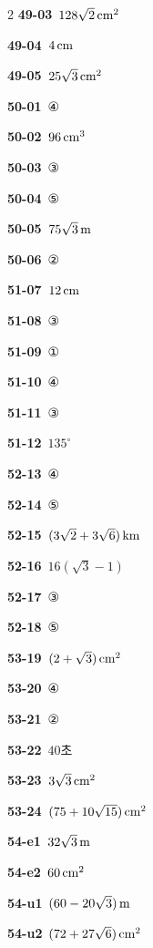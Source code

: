 \documentclass[10pt,a4paper]{article}
\begin{document}
\begin{multicols}{2}
\noindent\textbf{49-03}\ $128\sqrt{2}\mkern3mu \mathrm{cm}^2$\par
\noindent\textbf{49-04}\ $4\mkern3mu \mathrm{cm}$\par
\noindent\textbf{49-05}\ $25\sqrt{3}\mkern3mu \mathrm{cm}^2$\par
\noindent\textbf{50-01}\ ④\par
\noindent\textbf{50-02}\ $96\mkern3mu \mathrm{cm}^3$\par
\noindent\textbf{50-03}\ ③\par
\noindent\textbf{50-04}\ ⑤\par
\noindent\textbf{50-05}\ $75\sqrt{3}\mkern3mu \mathrm{m}$\par
\noindent\textbf{50-06}\ ②\par
\noindent\textbf{51-07}\ $12\mkern3mu \mathrm{cm}$\par
\noindent\textbf{51-08}\ ③\par
\noindent\textbf{51-09}\ ①\par
\noindent\textbf{51-10}\ ④\par
\noindent\textbf{51-11}\ ③\par
\noindent\textbf{51-12}\ $135^\circ$\par
\noindent\textbf{52-13}\ ④\par
\noindent\textbf{52-14}\ ⑤\par
\noindent\textbf{52-15}\ $(3\sqrt{2}+3\sqrt{6})\mkern3mu \mathrm{km}$\par
\noindent\textbf{52-16}\ $16(\sqrt{3}-1)$\par
\noindent\textbf{52-17}\ ③\par
\noindent\textbf{52-18}\ ⑤\par
\noindent\textbf{53-19}\ $(2+\sqrt{3})\mkern3mu \mathrm{cm}^2$\par
\noindent\textbf{53-20}\ ④\par
\noindent\textbf{53-21}\ ②\par
\noindent\textbf{53-22}\ $40$초\par
\noindent\textbf{53-23}\ $3\sqrt{3}\mkern3mu \mathrm{cm}^2$\par
\noindent\textbf{53-24}\ $(75+10\sqrt{15})\mkern3mu \mathrm{cm}^2$\par
\noindent\textbf{54-e1}\ $32\sqrt{3}\mkern3mu \mathrm{m}$\par
\noindent\textbf{54-e2}\ $60\mkern3mu \mathrm{cm}^2$\par
\noindent\textbf{54-u1}\ $(60-20\sqrt{3})\mkern3mu \mathrm{m}$\par
\noindent\textbf{54-u2}\ $(72+27\sqrt{6})\mkern3mu \mathrm{cm}^2$\par

\end{multicols}
\end{document}
